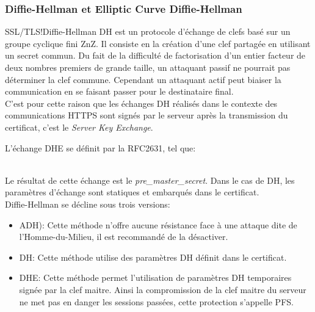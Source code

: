 \documentclass[twoside,a4paper,12pt,titlepage]{book}
\begin{document}
\subsubsection{Diffie-Hellman et Elliptic Curve Diffie-Hellman}
\begin{Define}{SSL/TLS!Diffie-Hellman}
\gls{DH} est un protocole d'échange de clefs basé sur un groupe cyclique fini \gls{ZnZ}. Il consiste en la création d'une clef partagée en utilisant un secret commun. Du fait de la difficulté de factorisation d'un entier facteur de deux nombres premiers de grande taille, un attaquant passif ne pourrait pas déterminer la clef commune. Cependant un attaquant actif peut biaiser la communication en se faisant passer pour le destinataire final.\\
C'est pour cette raison que les échanges \gls{DH} réalisés dans le contexte des communications \gls{HTTPS} sont signés par le serveur après la transmission du certificat, c'est le \textit{Server Key Exchange}.
\end{Define}
L'échange \gls{DHE} se définit par la RFC2631, tel que:\\
 \\
Le résultat de cette échange est le \textit{pre\_master\_secret}. Dans le cas de \gls{DH}, les paramètres d'échange sont statiques et embarqués dans le certificat.\\
Diffie-Hellman se décline sous trois versions:\begin{itemize}
\item \gls{ADH}): Cette méthode n'offre aucune résistance face à une attaque dite de l'Homme-du-Milieu, il est recommandé de la désactiver.
\item \gls{DH}: Cette méthode utilise des paramètres DH définit dans le certificat.
\item \gls{DHE}: Cette méthode permet l'utilisation de paramètres DH temporaires signée par la clef maitre. Ainsi la compromission de la clef maitre du serveur ne met pas en danger les sessions passées, cette protection s'appelle \gls{PFS}.
\end{itemize}
\end{document}
